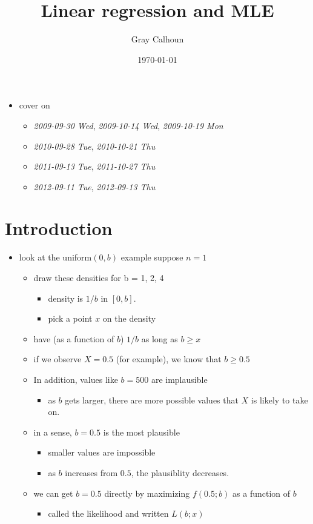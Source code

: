 \documentclass[11pt]{article}
\title{Linear regression and MLE}
\author{Gray Calhoun}
\date{\today}
\begin{document}
\maketitle

\setcounter{tocdepth}{2}
\tableofcontents
\vspace*{1cm}
\begin{itemize}
\item cover on
\begin{itemize}
\item \textit{2009-09-30 Wed}, \textit{2009-10-14 Wed}, \textit{2009-10-19 Mon}
\item \textit{2010-09-28 Tue}, \textit{2010-10-21 Thu}
\item \textit{2011-09-13 Tue}, \textit{2011-10-27 Thu}
\item \textit{2012-09-11 Tue}, \textit{2012-09-13 Thu}
\end{itemize}
\end{itemize}
\section{Introduction}
\label{sec-1}

\begin{itemize}
\item look at the uniform$(0,b)$ example suppose $n = 1$
\begin{itemize}
\item draw these densities for b = 1, 2, 4
\begin{itemize}
\item density is $1/b$ in $[0,b]$.
\item pick a point $x$ on the density
\end{itemize}
\item have (as a function of $b$) $1/b$ as long as $b \geq x$
\item if we observe $X = 0.5$ (for example), we know that $b \geq 0.5$
\item In addition, values like $b = 500$ are implausible
\begin{itemize}
\item as $b$ gets larger, there are more possible values that $X$ is
         likely to take on.
\end{itemize}
\item in a sense, $b = 0.5$ is the most plausible
\begin{itemize}
\item smaller values are impossible
\item as $b$ increases from $0.5$, the plausiblity decreases.
\end{itemize}
\item we can get $b = 0.5$ directly by maximizing $f(0.5; b)$ as a
       function of $b$
\begin{itemize}
\item called the likelihood and written $L(b; x)$
\end{itemize}
\end{itemize}
\end{itemize}
\end{document}
